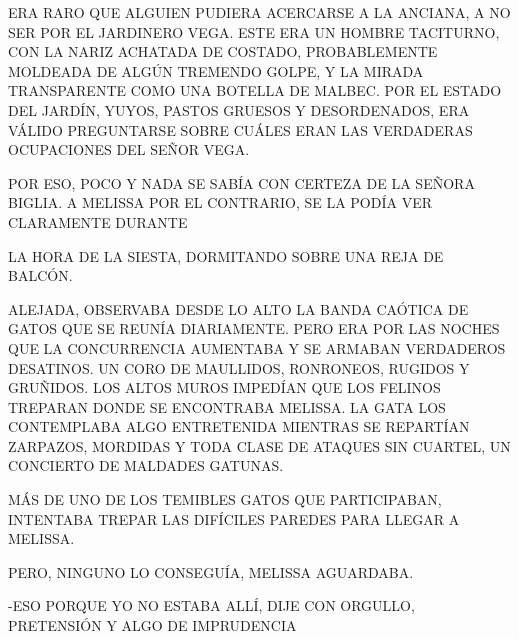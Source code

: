 ERA RARO QUE ALGUIEN PUDIERA ACERCARSE A LA ANCIANA, A NO SER POR EL JARDINERO VEGA. ESTE ERA UN HOMBRE TACITURNO, CON LA NARIZ ACHATADA DE COSTADO, PROBABLEMENTE MOLDEADA DE ALGÚN TREMENDO GOLPE, Y LA MIRADA TRANSPARENTE COMO UNA BOTELLA DE MALBEC. 
POR EL ESTADO DEL JARDÍN, YUYOS, PASTOS GRUESOS Y DESORDENADOS, ERA VÁLIDO PREGUNTARSE SOBRE CUÁLES ERAN LAS VERDADERAS OCUPACIONES DEL SEÑOR VEGA.


\newpage
{}
POR ESO, POCO Y NADA SE SABÍA CON CERTEZA DE LA SEÑORA BIGLIA. A MELISSA POR EL CONTRARIO, SE LA PODÍA VER CLARAMENTE DURANTE 

LA HORA DE LA SIESTA, DORMITANDO SOBRE UNA REJA DE BALCÓN.

ALEJADA, OBSERVABA DESDE LO ALTO LA BANDA CAÓTICA DE GATOS QUE SE REUNÍA DIARIAMENTE. PERO ERA POR LAS NOCHES QUE LA CONCURRENCIA AUMENTABA Y SE ARMABAN VERDADEROS DESATINOS. UN CORO DE MAULLIDOS, RONRONEOS, RUGIDOS Y GRUÑIDOS. LOS ALTOS MUROS IMPEDÍAN QUE LOS FELINOS TREPARAN DONDE SE ENCONTRABA MELISSA. LA GATA LOS CONTEMPLABA ALGO ENTRETENIDA MIENTRAS SE REPARTÍAN ZARPAZOS, MORDIDAS Y TODA CLASE DE ATAQUES SIN CUARTEL, UN CONCIERTO DE MALDADES GATUNAS.

MÁS DE UNO DE LOS TEMIBLES GATOS QUE PARTICIPABAN, INTENTABA TREPAR LAS DIFÍCILES PAREDES PARA LLEGAR A MELISSA.
\newpage
{}	
PERO, NINGUNO LO CONSEGUÍA, MELISSA AGUARDABA.

\newpage
{}
-ESO PORQUE YO NO ESTABA ALLÍ, DIJE CON ORGULLO, PRETENSIÓN	Y ALGO DE IMPRUDENCIA

